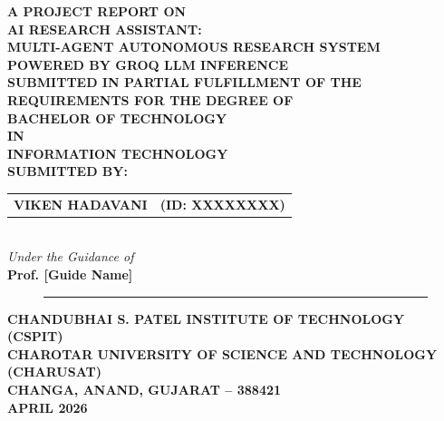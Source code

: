 \documentclass[a4paper,12pt]{report}
\begin{document}
\begin{titlepage}
\begin{center}
\vspace*{0.5cm}
{\fontsize{14}{17}\selectfont \textbf{A PROJECT REPORT ON}}\\[0.8cm]
{\fontsize{16}{19}\selectfont \textbf{AI RESEARCH ASSISTANT:\\MULTI-AGENT AUTONOMOUS RESEARCH SYSTEM\\POWERED BY GROQ LLM INFERENCE}}\\[1.5cm]
{\fontsize{12}{14}\selectfont \textbf{SUBMITTED IN PARTIAL FULFILLMENT OF THE\\REQUIREMENTS FOR THE DEGREE OF}}\\[0.6cm]
{\fontsize{14}{17}\selectfont \textbf{BACHELOR OF TECHNOLOGY}}\\[0.3cm]
{\fontsize{12}{14}\selectfont \textbf{IN}}\\[0.3cm]
{\fontsize{14}{17}\selectfont \textbf{INFORMATION TECHNOLOGY}}\\[1.5cm]
{\fontsize{12}{14}\selectfont \textbf{SUBMITTED BY:}}\\[0.4cm]
{\fontsize{12}{14}\selectfont
\begin{tabular}{ll}
\textbf{VIKEN HADAVANI} & \textbf{(ID: XXXXXXXX)}\\
\end{tabular}}\\[1.2cm]
{\fontsize{12}{14}\selectfont \textit{Under the Guidance of}}\\[0.3cm]
{\fontsize{12}{14}\selectfont \textbf{Prof. [Guide Name]}}\\[1.5cm]
\begin{figure}[H]
\centering
\rule{2.5cm}{2.5cm} %
\end{figure}
\vspace{0.3cm}
{\fontsize{12}{14}\selectfont \textbf{CHANDUBHAI S. PATEL INSTITUTE OF TECHNOLOGY (CSPIT)\\CHAROTAR UNIVERSITY OF SCIENCE AND TECHNOLOGY (CHARUSAT)\\CHANGA, ANAND, GUJARAT -- 388421}}\\[0.8cm]
{\fontsize{12}{14}\selectfont \textbf{APRIL 2026}}
\end{center}
\end{titlepage}
\end{document}
